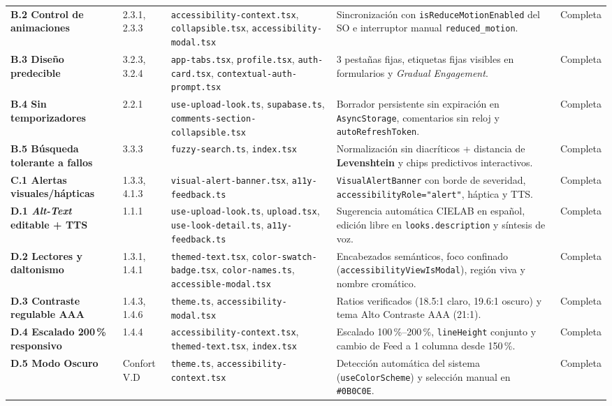 \documentclass[conference]{IEEEtran}
\begin{document}
\begin{table}[t]
\begin{tabularx}{\textwidth}{>{\bfseries}p{2.7cm} p{1.4cm} p{4.2cm} X p{1.3cm}}
B.2 Control de animaciones & 2.3.1, 2.3.3~\cite{ref14} & \texttt{accessibility-context.tsx}, \texttt{collapsible.tsx}, \texttt{accessibility-modal.tsx} & Sincronización con \texttt{isReduceMotionEnabled} del SO e interruptor manual \texttt{reduced\_motion}. & Completa \\
B.3 Diseño predecible & 3.2.3, 3.2.4~\cite{ref13} & \texttt{app-tabs.tsx}, \texttt{profile.tsx}, \texttt{auth-card.tsx}, \texttt{contextual-auth-prompt.tsx} & 3 pestañas fijas, etiquetas fijas visibles en formularios y \textit{Gradual Engagement}. & Completa \\
B.4 Sin temporizadores & 2.2.1 & \texttt{use-upload-look.ts}, \texttt{supabase.ts}, \texttt{comments-section-collapsible.tsx} & Borrador persistente sin expiración en \texttt{AsyncStorage}, comentarios sin reloj y \texttt{autoRefreshToken}. & Completa \\
B.5 Búsqueda tolerante a fallos & 3.3.3 & \texttt{fuzzy-search.ts}, \texttt{index.tsx} & Normalización sin diacríticos + distancia de \textbf{Levenshtein} y chips predictivos interactivos. & Completa \\
C.1 Alertas visuales/hápticas & 1.3.3, 4.1.3~\cite{ref15} & \texttt{visual-alert-banner.tsx}, \texttt{a11y-feedback.ts} & \texttt{VisualAlertBanner} con borde de severidad, \texttt{accessibilityRole="alert"}, háptica y TTS. & Completa \\
D.1 \textit{Alt-Text} editable + TTS & 1.1.1~\cite{ref16,ref17} & \texttt{use-upload-look.ts}, \texttt{upload.tsx}, \texttt{use-look-detail.ts}, \texttt{a11y-feedback.ts} & Sugerencia automática CIELAB en español, edición libre en \texttt{looks.description} y síntesis de voz. & Completa \\
D.2 Lectores y daltonismo & 1.3.1, 1.4.1 & \texttt{themed-text.tsx}, \texttt{color-swatch-badge.tsx}, \texttt{color-names.ts}, \texttt{accessible-modal.tsx} & Encabezados semánticos, foco confinado (\texttt{accessibilityViewIsModal}), región viva y nombre cromático. & Completa \\
D.3 Contraste regulable AAA & 1.4.3, 1.4.6 & \texttt{theme.ts}, \texttt{accessibility-modal.tsx} & Ratios verificados (18.5:1 claro, 19.6:1 oscuro) y tema Alto Contraste AAA (21:1). & Completa \\
D.4 Escalado 200\,\% responsivo & 1.4.4 & \texttt{accessibility-context.tsx}, \texttt{themed-text.tsx}, \texttt{index.tsx} & Escalado 100\,\%--200\,\%, \texttt{lineHeight} conjunto y cambio de Feed a 1 columna desde 150\,\%. & Completa \\
D.5 Modo Oscuro & Confort V.D & \texttt{theme.ts}, \texttt{accessibility-context.tsx} & Detección automática del sistema (\texttt{useColorScheme}) y selección manual en \texttt{\#0B0C0E}. & Completa \\
\bottomrule
\end{tabularx}
\end{table}
\end{document}
